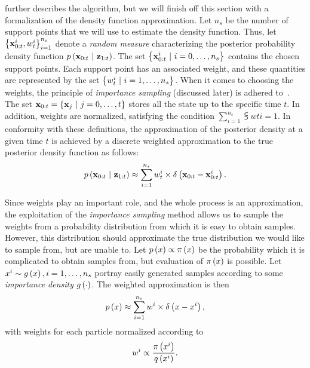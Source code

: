 \cite{arulampalam2007particlefilter} further describes the algorithm, but we will finish off this section with a formalization of the density function approximation. Let $n_s$ be the number of support points that we will use to estimate the density function. Thus, let ${\left\{ {{\mathbf{x}}_{0:t}^{i}, {w}_{t}^{i}} \right\}}_{i = 1}^{n_s}$ denote a \emph{random measure} characterizing the posterior probability density function $p \left( \mathbf{x}_{0:t} \ | \ \mathbf{z}_{1:t} \right)$. The set $\left\{ {{\mathbf{x}}_{0:t}^{i} \ | \ i = 0, \dots, n_s} \right\}$ contains the chosen support points. Each support point has an associated weight, and these quantities are represented by the set $\left\{ {{w}_{t}^{i} \ | \ i = 1, \dots, n_s} \right\}$. When it comes to choosing the weights, the principle of \emph{importance sampling} (discussed later) is adhered to~\cite{bergman1999recursive, stordal2008sequential}. The set $\vect{x}_{0:t} = \cbrackets{\vect{x}_j \ | \ j = 0, \dots, t}$ stores all the state up to the specific time $t$. In addition, weights are normalized, satisfying the condition $\sum_{i = 1}^{n_s} \subsup{w}{t}{i} = 1$. In conformity with these definitions, the approximation of the posterior density at a given time $t$ is achieved by a discrete weighted approximation to the true posterior density function as follows:
\begin{equation}
    p \left( \mathbf{x}_{0:t} \ | \ \mathbf{z}_{1:t} \right) \approx \sum_{i = 1}^{n_s} {w}_{t}^{i} \times {\delta} \left( \mathbf{x}_{0:t} - {\mathbf{x}}_{0:t}^{i} \right).
\end{equation}

Since weights play an important role, and the whole process is an approximation, the exploitation of the \emph{importance sampling} method allows us to sample the weights from a probability distribution from which it is easy to obtain samples. However, this distribution should approximate the true distribution we would like to sample from, but are unable to. Let $p \left( x \right) \propto {\pi} \left( x \right)$ be the probability which it is complicated to obtain samples from, but evaluation of ${\pi} \left( x \right)$ is possible. Let $x^i \sim {g} \left( x \right), i = 1, \dots, n_s$ portray easily generated samples according to some \emph{importance density} ${g} \left( \cdot \right)$. The weighted approximation is then
\begin{equation}
    p \left( x \right) \approx \sum_{i = 1}^{n_s} w^i \times {\delta} \left( x - x^i \right),
\end{equation}
with weights for each particle normalized according to
\begin{equation}
    w^i \propto \frac{{\pi} \left( x^i \right)}{{q} \left( x^i \right)}.
\end{equation}

